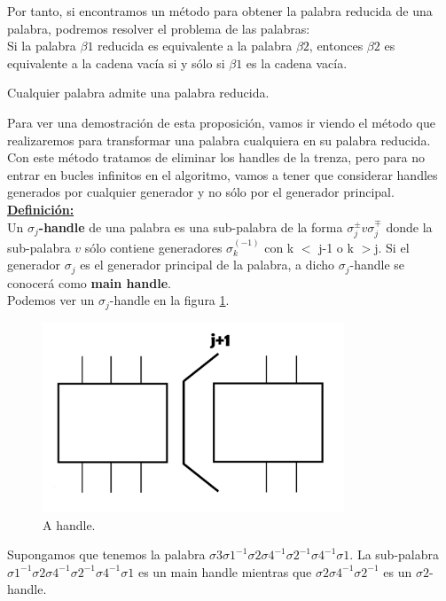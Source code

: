 Por tanto, si encontramos un método para obtener la palabra reducida de una palabra, podremos resolver el problema de las palabras: \\
Si la palabra $\beta1$ reducida es equivalente a la palabra $\beta2$, entonces $\beta2$ es equivalente a la cadena vacía si y sólo si $\beta1$ es la cadena vacía. \\

\begin{pro}
	Cualquier palabra admite una palabra reducida. 
\end{pro}

Para ver una demostración de esta proposición, vamos ir viendo el método que realizaremos para transformar una palabra cualquiera en su palabra reducida.\\ 
Con este método tratamos de eliminar los handles de la trenza, pero para no entrar en bucles infinitos en el algoritmo, vamos a tener que considerar handles generados por cualquier generador y no sólo por el generador principal.\\

\underline{\textbf{Definición:}}\\
 Un \textbf{$ \sigma_{j} $-handle} de una palabra es una sub-palabra de la forma $ \sigma_{j}^{\pm} v \sigma_{j}^{\mp} $ donde la sub-palabra $v$ sólo contiene generadores $\sigma_{k}^{(-1)} $ con k $<$ j-1 o k $>$j. Si el generador $\sigma_{j}$ es el generador principal de la palabra, a dicho $ \sigma_{j} $-handle se conocerá como \textbf{main handle}.\\
 
 Podemos ver un $ \sigma_{j} $-handle en la figura \ref{h2}.\\
 \begin{figure}[h!]
 	\centering
 	\includegraphics[width=9cm]{itrenzas/h12.png}
 	\caption{A handle.}
 	\label{h2} 
 \end{figure}
 
 Supongamos que tenemos la palabra $ \sigma3\sigma1^{-1}\sigma2\sigma4^{-1}\sigma2^{-1}\sigma4^{-1}\sigma1 $. La sub-palabra $ \sigma1^{-1}\sigma2\sigma4^{-1}\sigma2^{-1}\sigma4^{-1}\sigma1  $ es un main handle mientras que $\sigma2\sigma4^{-1}\sigma2^{-1} $ es un $ \sigma2 $-handle.\\
 
